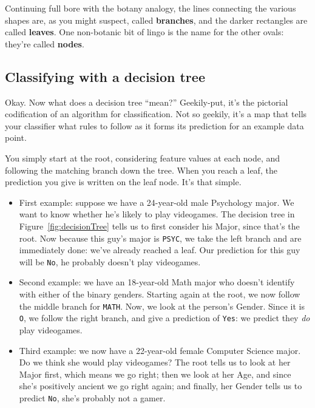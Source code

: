 
Continuing full bore with the botany analogy, the lines connecting the various
shapes are, as you might suspect, called \textbf{branches}, and the darker
rectangles are called \textbf{leaves}. One non-botanic bit of lingo is the name
for the other ovals: they're called \textbf{nodes}.

\subsection{Classifying with a decision tree}

Okay. Now what does a decision tree ``mean?'' Geekily-put, it's the pictorial
codification of an algorithm for classification. Not so geekily, it's a map
that tells your classifier what rules to follow as it forms its prediction for
an example data point.

You simply start at the root, considering feature values at each node, and
following the matching branch down the tree. When you reach a leaf, the
prediction you give is written on the leaf node. It's that simple.

\begin{itemize}

\item[\leftpointright] First example: suppose we have a 24-year-old male
Psychology major. We want to know whether he's likely to play videogames. The
decision tree in Figure~\ref{fig:decisionTree} tells us to first consider his
\textsf{Major}, since that's the root. Now because this guy's major is
\texttt{PSYC}, we take the left branch and are immediately done: we've already
reached a leaf. Our prediction for this guy will be \texttt{No}, he probably
doesn't play videogames.

\item[\leftpointright] Second example: we have an 18-year-old Math major who
doesn't identify with either of the binary genders. Starting again at the root,
we now follow the middle branch for \texttt{MATH}. Now, we look at the person's
\textsf{Gender}. Since it is \texttt{O}, we follow the right branch, and give a
prediction of \texttt{Yes}: we predict they \textit{do} play videogames.

\item[\leftpointright] Third example: we now have a 22-year-old female Computer
Science major. Do we think she would play videogames? The root tells us to look
at her \textsf{Major} first, which means we go right; then we look at her
\textsf{Age}, and since she's positively ancient we go right again; and
finally, her \textsf{Gender} tells us to predict \texttt{No}, she's probably
not a gamer.

\end{itemize}

